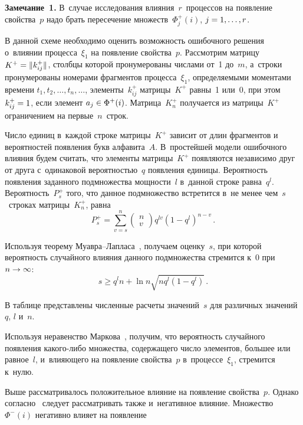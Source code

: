 \begin{multicols}{2}
  \smallskip
  
  \noindent
  \textbf{Замечание~1.} В~случае исследования влияния~$r$~процессов на 
появление свойства~$p$ надо брать пересечение множеств~$\Phi^+_j(i)$, 
$j\hm= 1, \ldots ,r$. 
  
  \smallskip
  
  В данной схеме необходимо оценить возможность ошибочного решения 
о~влиянии процесса~$\xi_1$ на появление свойства~$p$. Рассмотрим матрицу 
$K^+ \hm= \| k^+_{ij}\|$, столбцы которой пронумерованы чис\-ла\-ми от~1 
до~$m$, а~строки пронумерованы номерами фрагментов процесса~$\xi_1$, 
определяемыми моментами времени $t_1, t_2, \ldots , t_n,\ldots$, 
элементы~$k_{ij}^+$ матрицы~$K^+$ равны~1 или~0, при этом 
$k^+_{ij}\hm=1$, если элемент $a_j\hm\in \Phi^+(i)$. Матрица~$K_n^+$ 
получается из матрицы~$K^+$ ограничением на первые~$n$~строк. 
  
  Число единиц в~каждой строке матрицы~$K^+$ зависит от длин фрагментов 
и вероятностей появления букв алфавита~$A$. В~простейшей модели 
ошибочного влияния будем считать, что элементы матрицы~$K^+$ появляются 
независимо друг от друга с~одинаковой вероятностью~$q$ появления единицы. 
Вероятность появления заданного подмножества мощности~$l$ в~данной 
строке равна~$q^l$. Вероятность~$P_s^+$ того, что данное подмножество 
встретится в~не менее чем~$s$~строках матрицы~$K_n^+$, равна
  $$
  P_s^+ = \sum\limits_{v=s}^n \begin{pmatrix}
  n\\ v
  \end{pmatrix}
  q^{lv} \left( 1-q^l\right)^{n-v}\,.
  $$
  
  Используя теорему Муавра--Лапласа~\cite{8-gru}, получаем оценку~$s$, при 
которой вероятность случайного влияния данного подмножества стремится к~0 
при $n\hm\to\infty$:
  $$
  s\geq q^l n +\ln n \sqrt{nq^l \left( 1-q^l\right)}\,.
  $$
  
  В таблице представлены численные расчеты значений~$s$ для различных 
значений~$q$, $l$ и~$n$.
  

  
  Используя неравенство Маркова~\cite{9-gru}, получим, что вероятность 
случайного появления какого-либо множества, содержащего число элементов, 
большее или равное~$l$, и~влияющего на появление свойства~$p$ 
в~процессе~$\xi_1$, стремится к~нулю. 
  
  Выше рассматривалось положительное влияние на появление свойства~$p$. 
Однако согласно~\cite{6-gru} следует рассматривать также и~негативное 
влияние. Множество~$\Phi^-(i)$ негативно влияет на появление\linebreak\vspace*{-12pt}


\end{multicols}
